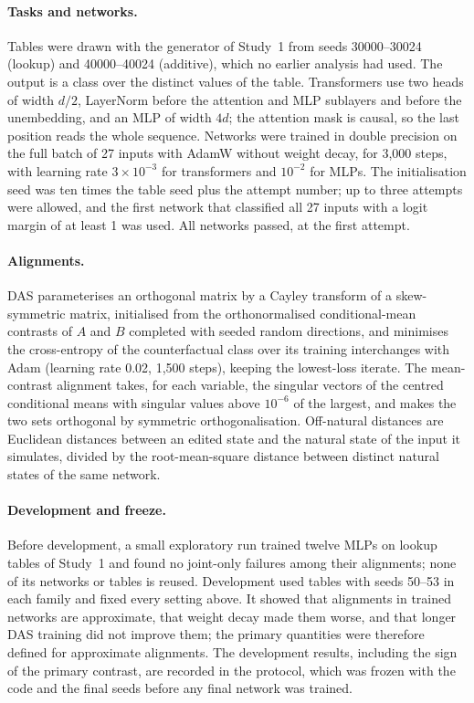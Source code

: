 \paragraph{Tasks and networks.}
Tables were drawn with the generator of Study~1 from seeds 30000--30024 (lookup) and 40000--40024 (additive), which
no earlier analysis had used. The output is a class over the distinct values of the table. Transformers use two heads
of width $d/2$, LayerNorm before the attention and MLP sublayers and before the unembedding, and an MLP of width $4d$;
the attention mask is causal, so the last position reads the whole sequence. Networks were trained in double
precision on the full batch of 27 inputs with AdamW without weight decay, for 3,000 steps, with learning rate
$3\times10^{-3}$ for transformers and $10^{-2}$ for MLPs. The initialisation seed was ten times the table seed plus
the attempt number; up to three attempts were allowed, and the first network that classified all 27 inputs with a
logit margin of at least 1 was used. All \TrnCompetent{} networks passed, \TrnFirstAttempt{} at the first attempt.

\paragraph{Alignments.}
DAS parameterises an orthogonal matrix by a Cayley transform of a skew-symmetric matrix, initialised from the
orthonormalised conditional-mean contrasts of $A$ and $B$ completed with seeded random directions, and minimises the
cross-entropy of the counterfactual class over its training interchanges with Adam (learning rate 0.02, 1,500 steps),
keeping the lowest-loss iterate. The mean-contrast alignment takes, for each variable, the singular vectors of the
centred conditional means with singular values above $10^{-6}$ of the largest, and makes the two sets orthogonal by
symmetric orthogonalisation. Off-natural distances are Euclidean distances between an edited state and the natural
state of the input it simulates, divided by the root-mean-square distance between distinct natural states of the
same network.

\paragraph{Development and freeze.}
Before development, a small exploratory run trained twelve MLPs on lookup tables of Study~1 and found no joint-only
failures among their alignments; none of its networks or tables is reused.
Development used tables with seeds 50--53 in each family and fixed every setting above. It showed that alignments in
trained networks are approximate, that weight decay made them worse, and that longer DAS training did not improve
them; the primary quantities were therefore defined for approximate alignments. The development results, including
the sign of the primary contrast, are recorded in the protocol, which was frozen with the code and the final seeds
before any final network was trained.


